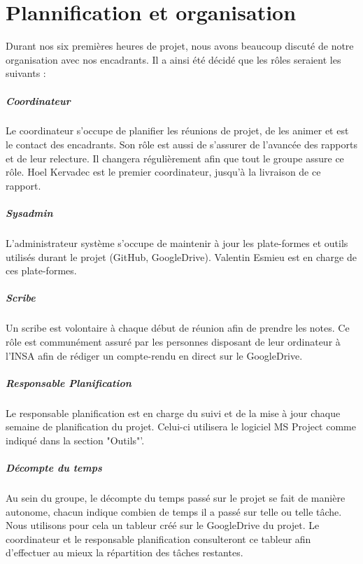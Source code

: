 \chapter{Plannification et organisation}

	Durant nos six premières heures de projet, nous avons beaucoup discuté de notre organisation avec nos encadrants. Il a ainsi été décidé que les rôles seraient les suivants :
	\paragraph{Coordinateur} Le coordinateur s'occupe de planifier les réunions de projet, de les animer et est le contact des encadrants. Son rôle est aussi de s'assurer de l'avancée des rapports et de leur relecture. Il changera régulièrement afin que tout le groupe assure ce rôle. Hoel Kervadec est le premier coordinateur, jusqu'à la livraison de ce rapport.
	\paragraph{Sysadmin} L'administrateur système s'occupe de maintenir à jour les plate-formes et outils utilisés durant le projet (GitHub, GoogleDrive). Valentin Esmieu est en charge de ces plate-formes.
	\paragraph{Scribe} Un scribe est volontaire à chaque début de réunion afin de prendre les notes. Ce rôle est communément assuré par les personnes disposant de leur ordinateur à l'INSA afin de rédiger un compte-rendu en direct sur le GoogleDrive.
	\paragraph{Responsable Planification} Le responsable planification est en charge du suivi et de la mise à jour chaque semaine de planification du projet. Celui-ci utilisera le logiciel MS Project comme indiqué dans la section "Outils"'.
	\paragraph{Décompte du temps} Au sein du groupe, le décompte du temps passé sur le projet se fait de manière autonome, chacun indique combien de temps il a passé sur telle ou telle tâche. Nous utilisons pour cela un tableur créé sur le GoogleDrive du projet. Le coordinateur et le responsable planification consulteront ce tableur afin d'effectuer au mieux la répartition des tâches restantes.


